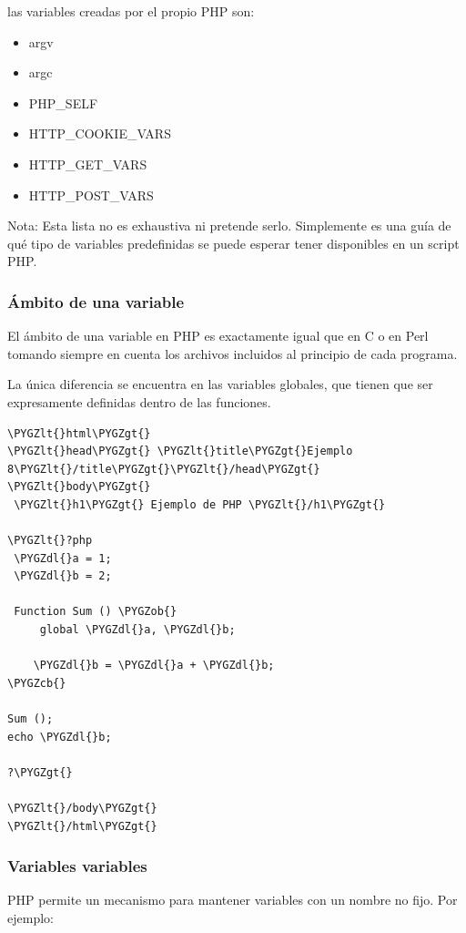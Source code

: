 \documentclass[a5paper,10pt,spanish]{sphinxmanual}
\def\PYGZob{\char`\{}
\def\PYGZcb{\char`\}}
\def\PYGZlt{\char`\<}
\def\PYGZgt{\char`\>}
\def\PYGZdl{\char`\$}
\begin{document}
las variables creadas por el propio PHP son:
\begin{itemize}
\item {} 
argv

\item {} 
argc

\item {} 
PHP\_SELF

\item {} 
HTTP\_COOKIE\_VARS

\item {} 
HTTP\_GET\_VARS

\item {} 
HTTP\_POST\_VARS

\end{itemize}

Nota: Esta lista no es exhaustiva ni pretende serlo. Simplemente es una
guía de qué tipo de variables predefinidas se puede esperar tener
disponibles en un script PHP.


\subsubsection{Ámbito de una variable}
\label{Tutorial1_Conceptos.md:ambito-de-una-variable}
El ámbito de una variable en PHP es exactamente igual que en C o en Perl
tomando siempre en cuenta los archivos incluidos al principio de cada
programa.

La única diferencia se encuentra en las variables globales, que tienen
que ser expresamente definidas dentro de las funciones.

\begin{Verbatim}[commandchars=\\\{\}]
\PYGZlt{}html\PYGZgt{}
\PYGZlt{}head\PYGZgt{} \PYGZlt{}title\PYGZgt{}Ejemplo 8\PYGZlt{}/title\PYGZgt{}\PYGZlt{}/head\PYGZgt{}
\PYGZlt{}body\PYGZgt{}
 \PYGZlt{}h1\PYGZgt{} Ejemplo de PHP \PYGZlt{}/h1\PYGZgt{}

\PYGZlt{}?php
 \PYGZdl{}a = 1;
 \PYGZdl{}b = 2;

 Function Sum () \PYGZob{}
     global \PYGZdl{}a, \PYGZdl{}b;

    \PYGZdl{}b = \PYGZdl{}a + \PYGZdl{}b;
\PYGZcb{}

Sum ();
echo \PYGZdl{}b;

?\PYGZgt{}

\PYGZlt{}/body\PYGZgt{}
\PYGZlt{}/html\PYGZgt{}
\end{Verbatim}


\subsubsection{Variables variables}
\label{Tutorial1_Conceptos.md:variables-variables}
PHP permite un mecanismo para mantener variables con un nombre no fijo.
Por ejemplo:
\end{document}
